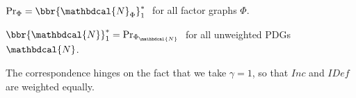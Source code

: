 \documentclass[letterpaper]{article} %
\theoremstyle{plain}
\theoremstyle{definition}
\theoremstyle{remark}
\newcommand{\begthm}[3][]{\begin{#2}[{name=#1},restate=#3,label=#3]}
\newcommand{\dg}[1]{\mathbdcal{#1}}
\newcommand{\IDef}[1]{\mathit{IDef}_{\!#1}}
\newcommand\Inc{\mathit{Inc}}
\newcommand{\UPDGof}[1]{{\dg N}_{#1}}
\newcommand{\FGof}[1]{\Phi_{{#1}}}
\begin{document}
\begthm{theorem}{thm:fg-is-pdg}
$\Pr_{\Phi} = \bbr{\UPDGof{\Phi}}_{1}^*\;$ for all factor graphs $\Phi$.
\end{theorem}
\begthm{theorem}{thm:pdg-is-fg}
$\bbr{\dg N}_{1}^* = \Pr_{\FGof{\dg N}}\;$ for all unweighted
	PDGs $\dg N$.  
\end{theorem}
The correspondence hinges on the fact that we take $\gamma=1$, so that $\Inc$ and
$\IDef{}$ are weighted equally.
\end{document}
